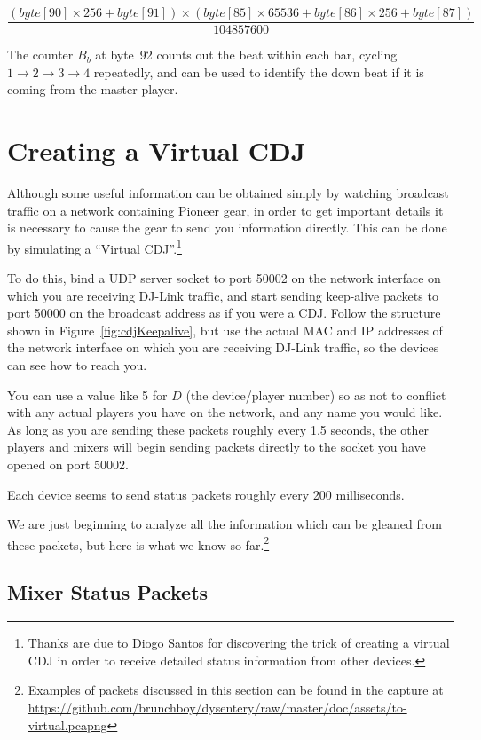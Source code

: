 \documentclass[11pt]{article}
\begin{document}
\[ \frac{(byte[90] \times 256 + byte[91]) \times (byte[85] \times 65536 + byte[86]  \times 256 + byte[87])}
   {104857600} \]

The counter $B_b$ at byte~92 counts out the beat within each bar,
cycling $1\to2\to3\to4$ repeatedly, and can be used to identify the
down beat if it is coming from the master player.

\section{Creating a Virtual CDJ}
\label{sec:virtualCdj}

Although some useful information can be obtained simply by watching
broadcast traffic on a network containing Pioneer gear, in order to
get important details it is necessary to cause the gear to send you
information directly. This can be done by simulating a ``Virtual
CDJ''.\footnote{Thanks are due to Diogo Santos for discovering the
  trick of creating a virtual CDJ in order to receive detailed status
  information from other devices.}

To do this, bind a UDP server socket to port 50002 on the network
interface on which you are receiving DJ-Link traffic, and start
sending keep-alive packets to port 50000 on the broadcast address as
if you were a CDJ. Follow the structure shown in
Figure~\ref{fig:cdjKeepalive}, but use the actual MAC and IP addresses
of the network interface on which you are receiving DJ-Link traffic,
so the devices can see how to reach you.

You can use a value like 5 for $D$ (the device/player number) so
as not to conflict with any actual players you have on the network,
and any name you would like. As long as you are sending these packets
roughly every 1.5 seconds, the other players and mixers will begin
sending packets directly to the socket you have opened on port 50002.

Each device seems to send status packets roughly every 200 milliseconds.

We are just beginning to analyze all the information which can be
gleaned from these packets, but here is what we know so
far.\footnote{Examples of packets discussed in this section can be
  found in the capture at
  \url{https://github.com/brunchboy/dysentery/raw/master/doc/assets/to-virtual.pcapng}}

\subsection{Mixer Status Packets}
\end{document}
